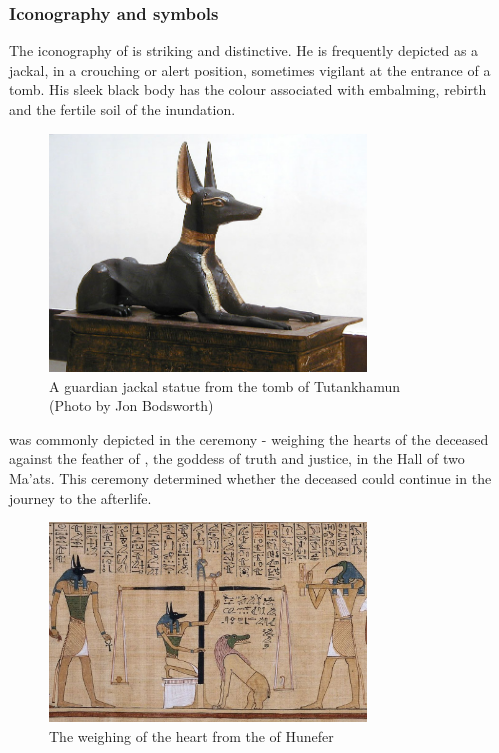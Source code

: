 \subsubsection*{Iconography and symbols}

The iconography of  is striking and distinctive. He is frequently depicted as a jackal, in a crouching or alert position, sometimes vigilant at the entrance of a tomb. His sleek black body has the colour associated with embalming, rebirth and the fertile soil of the  inundation.

\begin{figure} [H]
	\centering
	\includegraphics[width=0.75\textwidth]{../photos/Tutankhamun_Jackal}
	\caption{A guardian jackal statue from the tomb of Tutankhamun\\(Photo by Jon Bodsworth)}
\end{figure}

 was commonly depicted in the  ceremony - weighing the hearts of the deceased against the feather of , the goddess of truth and justice, in the Hall of two Ma'ats. This ceremony determined whether the deceased could continue in the journey to the afterlife.

\begin{figure} [H]
	\centering
	\includegraphics[width=0.75\textwidth]{../photos/Anubis_Hunefer}
	\caption{The weighing of the heart from the  of Hunefer}
\end{figure}

